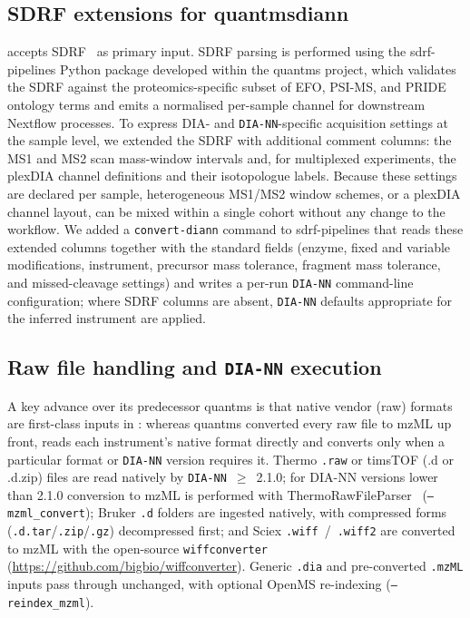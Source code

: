 \documentclass[preprint,12pt]{elsarticle}
\begin{document}
\subsection{SDRF extensions for quantmsdiann}
\quantmsdiann{} accepts SDRF~\cite{dai2021sdrf} as primary input.
SDRF parsing is performed using the sdrf-pipelines Python package developed within the quantms project, which validates the SDRF against the proteomics-specific subset of EFO, PSI-MS, and PRIDE ontology terms and emits a normalised per-sample channel for downstream Nextflow processes. To express DIA- and \texttt{DIA-NN}-specific acquisition settings at the sample level, we extended the SDRF with additional comment columns: the MS1 and MS2 scan mass-window intervals and, for multiplexed experiments, the plexDIA channel definitions and their isotopologue labels. Because these settings are declared per sample, heterogeneous MS1/MS2 window schemes, or a plexDIA channel layout, can be mixed within a single cohort without any change to the workflow. We added a \texttt{convert-diann} command to sdrf-pipelines that reads these extended columns together with the standard fields (enzyme, fixed and variable modifications, instrument, precursor mass tolerance, fragment mass tolerance, and missed-cleavage settings) and writes a per-run \texttt{DIA-NN} command-line configuration; where SDRF columns are absent, \texttt{DIA-NN} defaults appropriate for the inferred instrument are applied.

\subsection{Raw file handling and \texttt{DIA-NN} execution}
A key advance over its predecessor quantms is that native vendor (raw) formats are first-class inputs in \quantmsdiann{}: whereas quantms converted every raw file to mzML up front, \quantmsdiann{} reads each instrument's native format directly and converts only when a particular format or \texttt{DIA-NN} version requires it. Thermo \texttt{.raw} or timsTOF (.d or .d.zip) files are read natively by \texttt{DIA-NN}~$\geq$~2.1.0; for DIA-NN versions lower than 2.1.0 conversion to mzML is performed with ThermoRawFileParser~\cite{hulstaert2020} (\texttt{--mzml\_convert}); Bruker \texttt{.d} folders are ingested natively, with compressed forms (\texttt{.d.tar}/\texttt{.zip}/\texttt{.gz}) decompressed first; and Sciex \texttt{.wiff}~/~\texttt{.wiff2} are converted to mzML with the open-source \texttt{wiffconverter} (\url{https://github.com/bigbio/wiffconverter}). Generic \texttt{.dia} and pre-converted \texttt{.mzML} inputs pass through unchanged, with optional OpenMS re-indexing (\texttt{--reindex\_mzml}).
\end{document}
